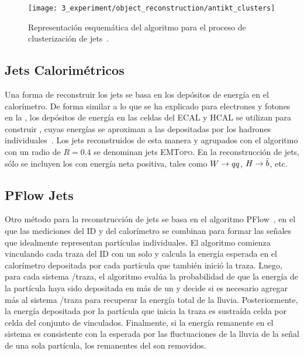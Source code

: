 \begin{figure}[ht!]
    \centering
    \texttt{[image: 3\_experiment/object\_reconstruction/antikt\_clusters]}
    \caption{Representación esquemática del algoritmo \antikt para el proceso de clusterización de jets~\cite{AntiKtAlgorithm}.}
    \label{fig:objects:jets:antikt}
\end{figure}

\subsection{Jets Calorimétricos}

Una forma de reconstruir los jets se basa en los depósitos de energía en el calorímetro. De forma similar a lo que se ha explicado para electrones y fotones en la \Sect{\ref{subsec:objects:egamma:reco}}, los depósitos de energía en las celdas del \ac{ECAL} y \ac{HCAL} se utilizan para construir \topos, cuyas energías se aproximan a las depositadas por los hadrones individuales~\cite{ATLAS-TopoClusters-Run1,ATLAS-TopoClusters-Run2}. Los jets reconstruidos de esta manera y agrupados con el algoritmo \antikt con un radio de \(R=0.4\) se denominan jets \textsc{EMTopo}. En la reconstrucción de jets, sólo se incluyen los \topos con energía neta positiva, tales como \(W \rightarrow qq\), \(H \rightarrow \bar{b}\), etc.

\subsection{\acf{PFlow} Jets}

Otro método para la reconstrucción de jets se basa en el algoritmo \ac{PFlow}~\cite{ATLAS-JetPFlow-Performance}, en el que las mediciones del \ac{ID} y del calorímetro se combinan para formar las señales que idealmente representan partículas individuales. El algoritmo comienza vinculando cada traza del \ac{ID} con un solo \topo y calcula la energía esperada en el calorímetro depositada por cada partícula que también inició la traza. Luego, para cada sistema \topo/traza, el algoritmo evalúa la probabilidad de que la energía de la partícula haya sido depositada en más de un \topo y decide si es necesario agregar más \topos al sistema \topo/traza para recuperar la energía total de la lluvia. Posteriormente, la energía depositada por la partícula que inicia la traza es sustraída celda por celda del conjunto de \topos vinculados. Finalmente, si la energía remanente en el sistema es consistente con la esperada por las fluctuaciones de la lluvia de la señal de una sola partícula, los remanentes del \topo son removidos.

